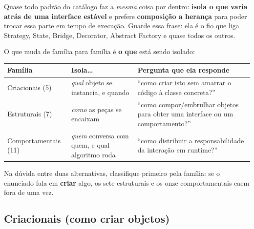 \begin{conceito}
Quase todo padrão do catálogo faz a \emph{mesma} coisa por dentro:
\textbf{isola o que varia atrás de uma interface estável} e prefere
\textbf{composição a herança} para poder trocar essa parte em tempo de
execução. Guarde essa frase: ela é o fio que liga Strategy, State, Bridge,
Decorator, Abstract Factory e quase todos os outros.

O que muda de família para família é \textbf{o que} está sendo isolado:

\begin{center}
\begin{tabular}{@{}p{3.2cm}p{3.8cm}p{4.8cm}@{}}
\toprule
\textbf{Família} & \textbf{Isola\ldots} & \textbf{Pergunta que ela responde} \\
\midrule
Criacionais (5) & \emph{qual} objeto se instancia, e quando & ``como criar isto sem amarrar o código à classe concreta?'' \\
Estruturais (7) & \emph{como} as peças se encaixam & ``como compor/embrulhar objetos para obter uma interface ou um comportamento?'' \\
Comportamentais (11) & \emph{quem} conversa com quem, e qual algoritmo roda & ``como distribuir a responsabilidade da interação em runtime?'' \\
\bottomrule
\end{tabular}
\end{center}

Na dúvida entre duas alternativas, classifique primeiro pela família: se o
enunciado fala em \textbf{criar} algo, os sete estruturais e os onze
comportamentais caem fora de uma vez.
\end{conceito}

\subsection{Criacionais (como criar objetos)}

